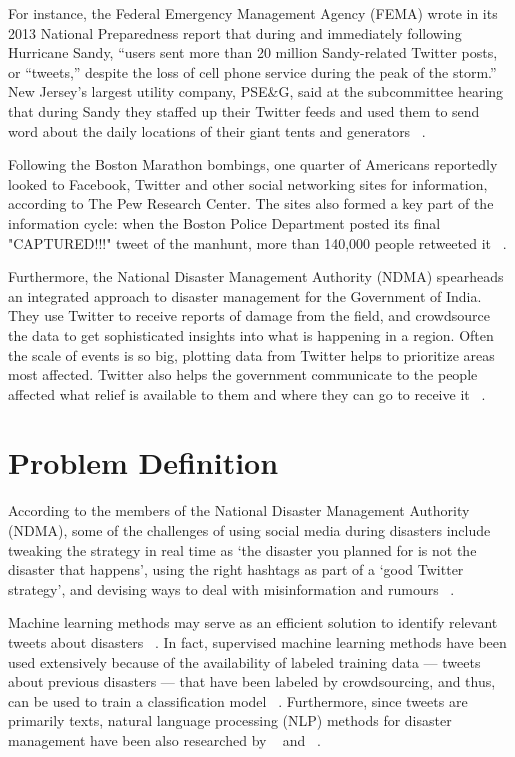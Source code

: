 For instance, the Federal Emergency Management Agency (FEMA) wrote in its 2013 National Preparedness report that during and immediately following Hurricane Sandy, “users sent more than 20 million Sandy-related Twitter posts, or “tweets,” despite the loss of cell phone service during the peak of the storm.” New Jersey’s largest utility company, PSE\&G, said at the subcommittee hearing that during Sandy they staffed up their Twitter feeds and used them to send word about the daily locations of their giant tents and generators ~\citep{scientificamer}.

Following the Boston Marathon bombings, one quarter of Americans reportedly looked to Facebook, Twitter and other social networking sites for information, according to The Pew Research Center. The sites also formed a key part of the information cycle: when the Boston Police Department posted its final "CAPTURED!!!" tweet of the manhunt, more than 140,000 people retweeted it ~\citep{scientificamer}.

Furthermore, the National Disaster Management Authority (NDMA) spearheads an integrated approach to disaster management for the Government of India. They use Twitter to receive reports of damage from the field, and crowdsource the data to get sophisticated insights into what is happening in a region. Often the scale of events is so big, plotting data from Twitter helps to prioritize areas most affected. Twitter also helps the government communicate to the people affected what relief is available to them and where they can go to receive it ~\citep{twittercrisisblog}.

\section{Problem Definition}
\label{problemdefinition}

According to the members of the National Disaster Management Authority (NDMA), some of the challenges of using social media during disasters include tweaking the strategy in real time as ‘the disaster you planned for is not the disaster that happens’, using the right hashtags as part of a ‘good Twitter strategy', and devising ways to deal with misinformation and rumours ~\citep{twittercrisisblog}.

Machine learning methods may serve as an efficient solution to identify relevant tweets about disasters ~\citep{tweedr}. In fact, supervised machine learning methods have been used extensively because of the availability of labeled training data --- tweets about previous disasters --- that have been labeled by crowdsourcing, and thus, can be used to train a classification model ~\citep{starbird}. Furthermore, since tweets are primarily texts, natural language processing (NLP) methods for disaster management have been also researched by ~\citep{sakaki} and ~\citep{terpstra}. 


